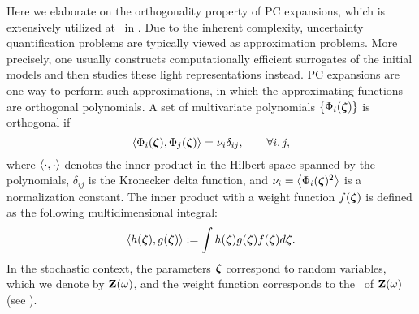 Here we elaborate on the orthogonality property \cite{xiu2010, maitre2010} of PC expansions, which is extensively utilized at \ in .
Due to the inherent complexity, uncertainty quantification problems are typically viewed as approximation problems.
More precisely, one usually constructs computationally efficient surrogates of the initial models and then studies these light representations instead.
PC expansions \cite{xiu2010} are one way to perform such approximations, in which the approximating functions are orthogonal polynomials.
A set of multivariate polynomials $\{ \Phi_i(\boldsymbol{\zeta}) \}$ is orthogonal if
\begin{equation} \elabel{orthogonality}
  \oInner{\pcb_i(\vz)}{\pcb_j(\vz)} = \pcn_i \delta_{ij}, \qquad \forall i, j,
\end{equation}
where $\oInner{\cdot}{\cdot}$ denotes the inner product in the Hilbert space spanned by the polynomials, $\delta_{ij}$ is the Kronecker delta function, and $\pcn_i = \oInner{\pcb_i(\vz)^2}$ is a normalization constant.
The inner product with a weight function $f(\boldsymbol{\zeta})$ is defined as the following multidimensional integral:
\begin{equation} \elabel{inner-product}
  \oInner{h(\vz)}{g(\vz)} := \int h(\vz) g(\vz) \fPDF(\vz) d\vz.
\end{equation}
In the stochastic context, the parameters $\boldsymbol{\zeta}$ correspond to random variables, which we denote by $\mathbf{Z}(\omega)$, and the weight function corresponds to the \pdf\ of $\mathbf{Z}(\omega)$ (see ).

